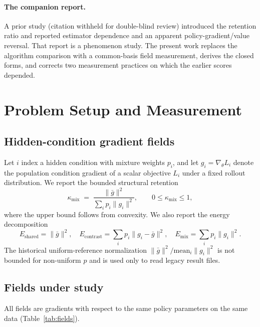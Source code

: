 \documentclass{article}
\newcommand{\kmix}{\kappa_{\mathrm{mix}}}
\newcommand{\gbar}{\bar{g}}
\begin{document}
\paragraph{The companion report.}
A prior study (citation withheld for double-blind review) introduced the
retention ratio and reported estimator dependence and an apparent
policy-gradient/value reversal. That report is a phenomenon study. The present
work replaces the algorithm comparison with a common-basis field measurement,
derives the closed forms, and corrects two measurement practices on which the
earlier scores depended.

\section{Problem Setup and Measurement}
\label{sec:setup}

\subsection{Hidden-condition gradient fields}
\label{sec:setup-fields}

Let $i$ index a hidden condition with mixture weights $p_i$, and let
$g_i=\nabla_\theta L_i$ denote the population condition gradient of a scalar
objective $L_i$ under a fixed rollout distribution. We report the bounded
structural retention
\begin{equation}
\kmix \;=\; \frac{\|\gbar\|^2}{\sum_i p_i \|g_i\|^2},
\qquad 0 \le \kmix \le 1,
\label{eq:kmix}
\end{equation}
where the upper bound follows from convexity. We also report the energy
decomposition
\begin{equation}
E_{\mathrm{shared}}=\|\gbar\|^2, \quad
E_{\mathrm{contrast}}=\sum_i p_i \|g_i-\gbar\|^2, \quad
E_{\mathrm{mix}}=\sum_i p_i\|g_i\|^2 .
\end{equation}
The historical uniform-reference normalization
$\|\gbar\|^2 / \mathrm{mean}_i \|g_i\|^2$ is not bounded for non-uniform $p$
and is used only to read legacy result files.

\subsection{Fields under study}
\label{sec:setup-objectives}

All fields are gradients with respect to the same policy parameters on the
same data (Table~\ref{tab:fields}).
\end{document}

